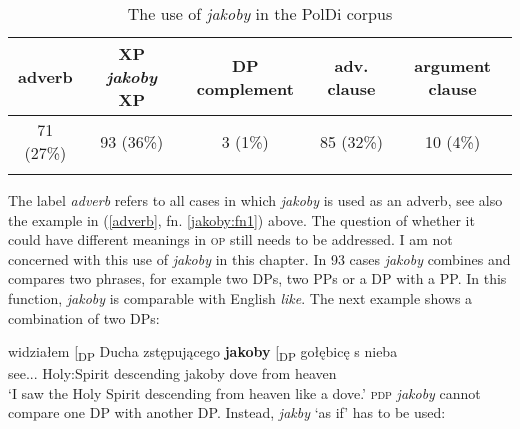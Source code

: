 \documentclass[output=paper]{langsci/langscibook}
\begin{document}
\begin{table}[h]  \begin{tabular}{ccccc}
 \lsptoprule
adverb & XP \emph{jakoby} XP & DP complement & \newline adv. clause & argument clause \\
\midrule
 71 (27\%) & 93 (36\%) & 3 (1\%) & 85 (32\%) & 10 (4\%)  \\
 \lspbottomrule
\end{tabular}
\caption{The use of \emph{jakoby} in the PolDi corpus} \label{staropolski_statystka}
\end{table}

\noindent The label \textit{adverb} refers to all cases in which \emph{jakoby} is used as an adverb, see also the example in (\ref{adverb}, fn. \ref{jakoby:fn1}) above. The question of whether it could have different meanings in \textsc{op} still needs to be addressed. I am not concerned with this use of \emph{jakoby} in this chapter. In 93 cases \emph{jakoby} combines and compares two phrases, for example two DPs, two PPs or a DP with a PP. In this function, \emph{jakoby} is comparable with English \emph{like}. The next example shows a combination of two DPs:

\ea \gll widziałem {\normalfont[\textsubscript{DP}} Ducha zstępującego{\cb} \textbf{jakoby} {\normalfont[\textsubscript{DP}} gołębicę s nieba{\cb} \label{pingwin} \\
		see.{\lptcp}.{\masc}.{\firstperson}{\sg} {} {Holy:Spirit} descending jakoby {} dove from heaven \\
\glt	`I saw the Holy Spirit descending from heaven like a dove.' 
\z
\textsc{pdp} \emph{jakoby} cannot compare one DP with another DP. Instead, \emph{jakby} `as if' has to be used:
\end{document}
